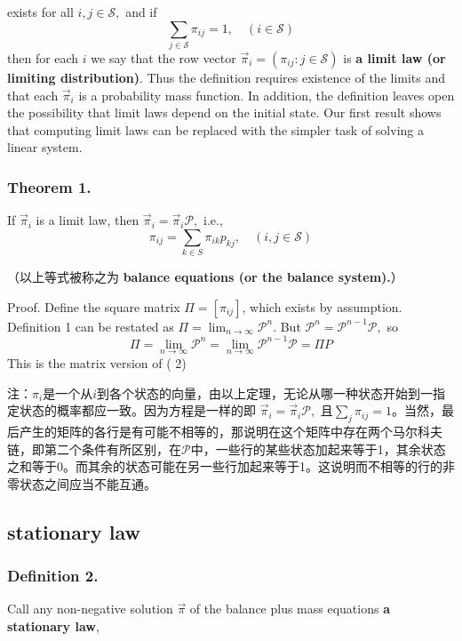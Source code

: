 \documentclass[UTF8]{ctexart}
\begin{document}
exists for all $i, j \in \mathcal{S},$ and if
$$
\sum_{j \in \mathcal{S}} \pi_{i j}=1, \quad(i \in \mathcal{S})
$$
then for each $i$ we say that the row vector $\vec{\pi}_{i}=\left(\pi_{i j}: j \in \mathcal{S}\right)$ is \textbf{a limit law (or limiting distribution)}. Thus the definition requires existence of the limits and that each $\vec{\pi}_{i}$ is a probability mass function. In addition, the definition leaves open the possibility that limit laws depend on the initial state. Our first result shows that computing limit laws can be replaced with the simpler task of solving a linear system.

\subsubsection{Theorem 1. } If $\vec{\pi}_{i}$ is a limit law, then $\vec{\pi}_{i}=\vec{\pi}_{i} \mathcal{P},$ i.e.,
$$
\pi_{i j}=\sum_{k \in S} \pi_{i k} p_{k j}, \quad(i, j \in \mathcal{S}) 
$$

（以上等式被称之为\textbf{ balance equations (or the balance system).}）

Proof. Define the square matrix $\Pi=\left[\pi_{i j}\right]$, which exists by assumption. Definition 1 can be restated as $\Pi=\lim _{n \rightarrow \infty} \mathcal{P}^{n} .$ But $\mathcal{P}^{n}=\mathcal{P}^{n-1} \mathcal{P},$ so
$$
\Pi=\lim _{n \rightarrow \infty} \mathcal{P}^{n}=\lim _{n \rightarrow \infty} \mathcal{P}^{n-1} \mathcal{P}=\Pi P
$$
This is the matrix version of ( 2)

注：$\pi_i$是一个从$i$到各个状态的向量，由以上定理，无论从哪一种状态开始到一指定状态的概率都应一致。因为方程是一样的即 $\vec{\pi}_{i}=\vec{\pi}_{i} \mathcal{P},$ 且$\sum_j\pi_{ij}=1$。当然，最后产生的矩阵的各行是有可能不相等的，那说明在这个矩阵中存在两个马尔科夫链，即第二个条件有所区别，在$\mathcal{P}$中，一些行的某些状态加起来等于1，其余状态之和等于0。而其余的状态可能在另一些行加起来等于1。这说明而不相等的行的非零状态之间应当不能互通。


\subsection{stationary law}

\subsubsection{Definition 2. }
Call any non-negative solution $\vec{\pi}$ of the balance plus mass equations \textbf{a stationary law},
\end{document}
